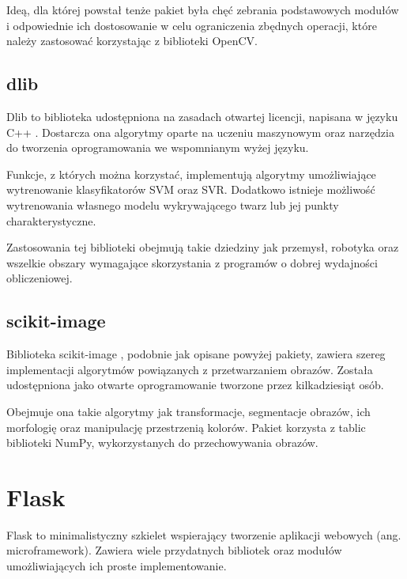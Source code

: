 Ideą, dla której powstał tenże pakiet była chęć zebrania podstawowych modułów i odpowiednie ich dostosowanie w celu ograniczenia zbędnych operacji, które należy zastosować korzystając z biblioteki OpenCV.


\subsection{dlib}
Dlib to biblioteka udostępniona na zasadach otwartej licencji, napisana w języku C++ \cite{dlib}. Dostarcza ona algorytmy oparte na uczeniu maszynowym oraz narzędzia do tworzenia oprogramowania we wspomnianym wyżej języku. 

Funkcje, z których można korzystać, implementują algorytmy umożliwiające wytrenowanie klasyfikatorów SVM oraz SVR. Dodatkowo istnieje możliwość wytrenowania własnego modelu wykrywającego twarz lub jej punkty charakterystyczne.

Zastosowania tej biblioteki obejmują takie dziedziny jak przemysł, robotyka oraz wszelkie obszary wymagające skorzystania z programów o dobrej wydajności obliczeniowej.


\subsection{scikit-image}
Biblioteka scikit-image \cite{skimage}, podobnie jak opisane powyżej pakiety, zawiera szereg implementacji algorytmów powiązanych z przetwarzaniem obrazów. Została udostępniona jako otwarte oprogramowanie tworzone przez kilkadziesiąt osób. 

Obejmuje ona takie algorytmy jak transformacje, segmentacje obrazów, ich morfologię oraz manipulację przestrzenią kolorów. Pakiet korzysta z tablic biblioteki NumPy, wykorzystanych do przechowywania obrazów.


\section{Flask}
Flask \cite{flask} to minimalistyczny szkielet wspierający tworzenie aplikacji webowych (ang. microframework). Zawiera wiele przydatnych bibliotek oraz modułów umożliwiających ich proste implementowanie.

